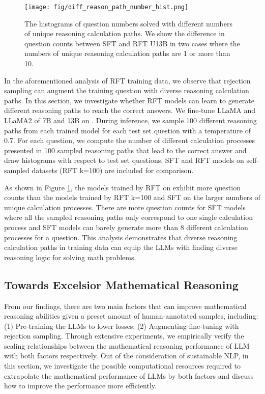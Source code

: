 \documentclass{article} \usepackage{iclr2021_conference,times}
\begin{document}
\label{different_path}

\begin{figure}[t]
    \centering
    \small    \texttt{[image: fig/diff\_reason\_path\_number\_hist.png]}
    \caption{The histograms of question numbers solved with different numbers of unique reasoning calculation paths. We show the difference in question counts between SFT and RFT U13B in two cases where the numbers of unique reasoning calculation paths are 1 or more than 10.}
    \label{fig:reason-dist}
\end{figure}

In the aforementioned analysis of RFT training data, we observe that rejection sampling can augment the training question with diverse reasoning calculation paths. In this section, we investigate whether RFT models can learn to generate different reasoning paths to reach the correct answers.  
We fine-tune LLaMA and LLaMA2 of 7B and 13B on . During inference, we sample 100 different reasoning paths from each trained model for each test set question with a temperature of 0.7. For each question, we compute the number of different calculation processes presented in 100 sampled reasoning paths that lead to the correct answer and draw histograms with respect to test set questions. SFT and RFT models on self-sampled datasets (RFT k=100) are included for comparison.

As shown in Figure \ref{fig:reason-dist}, the models trained by RFT on  exhibit more question counts than the models trained by RFT k=100 and SFT on the larger numbers of unique calculation processes. There are more question counts for SFT models where all the sampled reasoning paths only correspond to one single calculation process and SFT models can barely generate more than 8 different calculation processes for a question. This analysis demonstrates that diverse reasoning calculation paths in training data can equip the LLMs with finding diverse reasoning logic for solving math problems. 


\subsection{Towards Excelsior Mathematical Reasoning}

From our findings, there are two main factors that can improve mathematical reasoning abilities given a preset amount of human-annotated samples, including:
(1) Pre-training the LLMs to lower losses;
(2) Augmenting fine-tuning with rejection sampling.
Through extensive experiments, we empirically verify the scaling relationships between the mathematical reasoning performance of LLM with both factors respectively. Out of the consideration of sustainable NLP, in this section, we investigate the possible computational resources required to extrapolate the mathematical performance of LLMs by both factors and discuss how to improve the performance more efficiently. 
\end{document}
